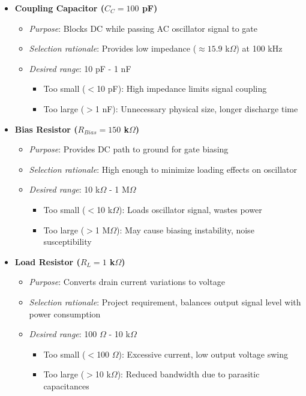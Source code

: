 \begin{itemize}
    \item \textbf{Coupling Capacitor ($C_C = 100$ pF)}
    \begin{itemize}
        \item \textit{Purpose}: Blocks DC while passing AC oscillator signal to gate
        \item \textit{Selection rationale}: Provides low impedance ($\approx 15.9$ k$\Omega$) at 100 kHz
        \item \textit{Desired range}: 10 pF - 1 nF
        \begin{itemize}
            \item Too small ($<$10 pF): High impedance limits signal coupling
            \item Too large ($>$1 nF): Unnecessary physical size, longer discharge time
        \end{itemize}
    \end{itemize}
    
    \item \textbf{Bias Resistor ($R_{Bias} = 150$ k$\Omega$)}
    \begin{itemize}
        \item \textit{Purpose}: Provides DC path to ground for gate biasing
        \item \textit{Selection rationale}: High enough to minimize loading effects on oscillator
        \item \textit{Desired range}: 10 k$\Omega$ - 1 M$\Omega$
        \begin{itemize}
            \item Too small ($<$10 k$\Omega$): Loads oscillator signal, wastes power
            \item Too large ($>$1 M$\Omega$): May cause biasing instability, noise susceptibility
        \end{itemize}
    \end{itemize}
    
    \item \textbf{Load Resistor ($R_L = 1$ k$\Omega$)}
    \begin{itemize}
        \item \textit{Purpose}: Converts drain current variations to voltage
        \item \textit{Selection rationale}: Project requirement, balances output signal level with power consumption
        \item \textit{Desired range}: 100 $\Omega$ - 10 k$\Omega$
        \begin{itemize}
            \item Too small ($<$100 $\Omega$): Excessive current, low output voltage swing
            \item Too large ($>$10 k$\Omega$): Reduced bandwidth due to parasitic capacitances
        \end{itemize}
    \end{itemize}
    

\end{itemize}
